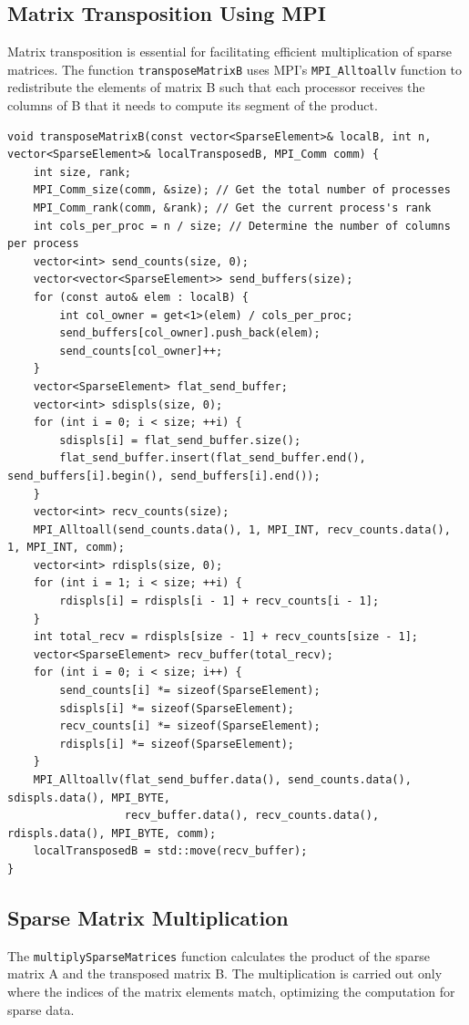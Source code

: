 \documentclass{article}
\begin{document}
\subsection{Matrix Transposition Using MPI}
Matrix transposition is essential for facilitating efficient multiplication of sparse matrices. The function \texttt{transposeMatrixB} uses MPI's \texttt{MPI\_Alltoallv} function to redistribute the elements of matrix B such that each processor receives the columns of B that it needs to compute its segment of the product.

\begin{verbatim}
void transposeMatrixB(const vector<SparseElement>& localB, int n,
vector<SparseElement>& localTransposedB, MPI_Comm comm) {
    int size, rank;
    MPI_Comm_size(comm, &size); // Get the total number of processes
    MPI_Comm_rank(comm, &rank); // Get the current process's rank
    int cols_per_proc = n / size; // Determine the number of columns per process
    vector<int> send_counts(size, 0);
    vector<vector<SparseElement>> send_buffers(size);
    for (const auto& elem : localB) {
        int col_owner = get<1>(elem) / cols_per_proc;
        send_buffers[col_owner].push_back(elem);
        send_counts[col_owner]++;
    }
    vector<SparseElement> flat_send_buffer;
    vector<int> sdispls(size, 0);
    for (int i = 0; i < size; ++i) {
        sdispls[i] = flat_send_buffer.size();
        flat_send_buffer.insert(flat_send_buffer.end(), send_buffers[i].begin(), send_buffers[i].end());
    }
    vector<int> recv_counts(size);
    MPI_Alltoall(send_counts.data(), 1, MPI_INT, recv_counts.data(), 1, MPI_INT, comm);
    vector<int> rdispls(size, 0);
    for (int i = 1; i < size; ++i) {
        rdispls[i] = rdispls[i - 1] + recv_counts[i - 1];
    }
    int total_recv = rdispls[size - 1] + recv_counts[size - 1];
    vector<SparseElement> recv_buffer(total_recv);
    for (int i = 0; i < size; i++) {
        send_counts[i] *= sizeof(SparseElement);
        sdispls[i] *= sizeof(SparseElement);
        recv_counts[i] *= sizeof(SparseElement);
        rdispls[i] *= sizeof(SparseElement);
    }
    MPI_Alltoallv(flat_send_buffer.data(), send_counts.data(), sdispls.data(), MPI_BYTE,
                  recv_buffer.data(), recv_counts.data(), rdispls.data(), MPI_BYTE, comm);
    localTransposedB = std::move(recv_buffer);
}
\end{verbatim}

\subsection{Sparse Matrix Multiplication}
The \texttt{multiplySparseMatrices} function calculates the product of the sparse matrix A and the transposed matrix B. The multiplication is carried out only where the indices of the matrix elements match, optimizing the computation for sparse data.
\end{document}
